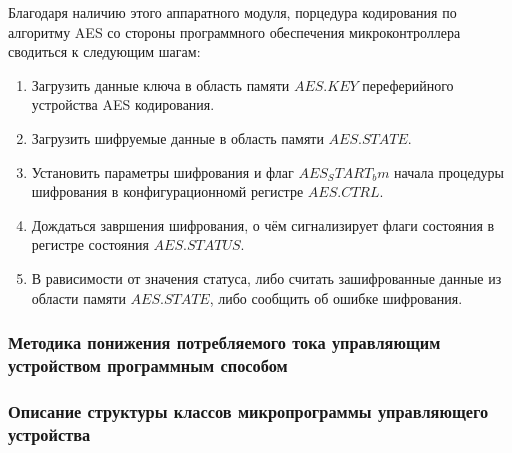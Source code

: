 Благодаря наличию этого аппаратного модуля, порцедура кодирования
по алгоритму AES со стороны программного обеспечения микроконтроллера
сводиться к следующим шагам:
\begin{enumerate}
    \item{} Загрузить данные ключа в область памяти $AES.KEY$
        переферийного устройства AES кодирования.
    \item{} Загрузить шифруемые данные в область памяти $AES.STATE$.
    \item{} Установить параметры шифрования и флаг $AES_START_bm$ начала
        процедуры шифрования в конфигурационномй регистре $AES.CTRL$.
    \item{} Дождаться завршения шифрования, о чём сигнализирует
        флаги состояния в регистре состояния $AES.STATUS$.
    \item{} В рависимости от значения статуса, либо считать зашифрованные
        данные из области памяти $AES.STATE$, либо сообщить об ошибке
        шифрования.
\end{enumerate}


\subsubsection{Методика понижения потребляемого тока управляющим устройством
программным способом}

\subsubsection{Описание структуры классов микропрограммы управляющего устройства}


